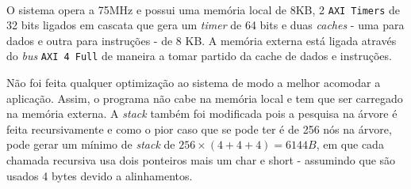 \paragraph{} O sistema opera a 75MHz e possui uma memória local de 8KB, 2 \texttt{AXI Timers} de 32 bits ligados em cascata que gera um \textit{timer} de 64 bits e duas \textit{caches} - uma para dados e outra para instruções - de 8 KB. A memória externa está ligada através do \textit{bus} \texttt{AXI 4 Full} de maneira a tomar partido da cache de dados e instruções.

Não foi feita qualquer optimização ao sistema de modo a melhor acomodar a aplicação. Assim, o programa não cabe na memória local e tem que ser carregado na memória externa. A \textit{stack} também foi modificada pois a pesquisa na árvore é feita recursivamente e como o pior caso que se pode ter é de 256 nós na árvore, pode gerar um mínimo de \textit{stack} de $256 \times (4 + 4 + 4) = 6144 B$, em que cada chamada recursiva usa dois ponteiros mais um char e short - assumindo que são usados 4 bytes devido a alinhamentos.
